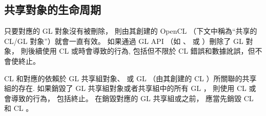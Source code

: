 \subsection{共享對象的生命周期}

只要對應的 GL 對象沒有被刪除，
則由其創建的 OpenCL （下文中稱為“共享的 CL/GL 對象”）就會一直有效。
如果通過 GL API （如 、  或 ）刪除了 GL 對象，
則後續使用 CL 或時會導致的行為,
包括但不限於 CL 錯誤和數據訛誤，但不會使終止。

CL 和對應的依賴於 GL 共享組對象、
或 GL （由其創建的 CL ）所關聯的共享組的存在.
如果銷毀了 GL 共享組對象或者共享組中的所有 GL ，
則使用 CL 或會導致的行為，
包括終止。
在銷毀對應的 GL 共享組或之前，
應當先銷毀 CL 和 CL 。


